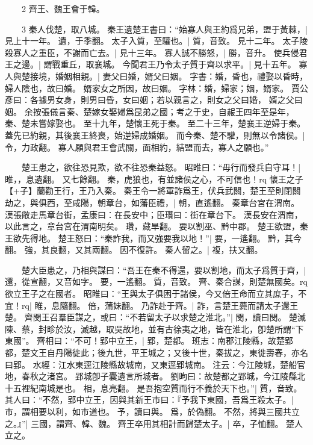 　　2 齊王、魏王會于韓。


　　3 秦人伐楚，取八城。
	秦王遺楚王書曰：“始寡人與王約爲兄弟，盟于黃棘，|{
	見上十一年。
	遺，于季翻。
}
太子入質，至驩也。|{
	質，音致。
	見十二年。
}
太子陵殺寡人之重臣，不謝而亡去。|{
	見十三年。
}
寡人誠不勝怒，|{
	勝，音升。
}
使兵侵君王之邊。|{
	謂戰重丘，取襄城。
}
今聞君王乃令太子質于齊以求平。|{
	見十五年。
}
寡人與楚接境，婚姻相親。|{
	妻父曰婚，婿父曰姻。
	字書：婚，昏也，禮娶以昏時，婦人陰也，故曰婚。
	婿家女之所因，故曰姻。
	字林：婚，婦家；姻，婿家。
	賈公彥曰：各據男女身，則男曰昏，女曰姻；若以親言之，則女之父曰婚， 婿之父曰姻。
	余按張儀言秦、楚嫁女娶婦爲昆弟之國；考之于史，自赧王四年至是年，秦、楚未嘗嫁娶也。
	至十九年，楚懷王死于秦。
	至二十三年，楚襄王逆婦于秦。
	蓋先已約親，其後襄王終喪，始逆婦成婚姻。
}
而今秦、楚不驩，則無以令諸侯。|{
	令，力政翻。
}
寡人願與君王會武關，面相約，結盟而去，寡人之願也。”

　　楚王患之，欲往恐見欺，欲不往恐秦益怒。
	昭睢曰：“毋行而發兵自守耳！|{
	睢，，息遺翻。
	又七餘翻。
}
秦，虎狼也，有並諸侯之心，不可信也！rq
懷王之子【+子】蘭勸王行，王乃入秦。
	秦王令一將軍詐爲王，伏兵武關，楚王至則閉關劫之，與俱西，至咸陽，朝章台，如藩臣禮，|{
	朝，直遙翻。
	秦章台宮在渭南。
	漢張敞走馬章台街，孟康曰：在長安中；臣瓚曰：街在章台下。
	漢長安在渭南，以此言之，章台宮在渭南明矣。
	瓚，藏旱翻。
}
要以割巫、黔中郡。
	楚王欲盟，秦王欲先得地。
	楚王怒曰：“秦詐我，而又強要我以地！”|{
	要，一遙翻。
	黔，其今翻。
	強，其良翻，又其兩翻。
}
因不復許。
	秦人留之。|{
	複，扶又翻。
}

　　楚大臣患之，乃相與謀曰：“吾王在秦不得還，要以割地，而太子爲質于齊，|{
	還，從宣翻，又音如字。
	要，一遙翻。
	質，音致。
}
齊、秦合謀，則楚無國矣。rq
欲立王子之在國者。
	昭睢曰：“王與太子俱困于諸侯，今又倍王命而立其庶子，不宜！rq|{
	睢，息隨翻。
	倍，蒲妹翻。
}
乃詐赴于齊。|{
	詐，言楚王薨而請太子還王楚。
}
齊閔王召羣臣謀之，或曰：“不若留太子以求楚之淮北。”|{
	閔，讀曰閔。
	楚滅陳、蔡，封畛於汝，滅越，取吳故地，並有古徐夷之地，皆在淮北，卽楚所謂“下東國”。
}
齊相曰：“不可！郢中立王，|{
	郢，楚都。
	班志：南郡江陵縣，故楚郢都，楚文王自丹陽徙此；後九世，平王城之；又後十世，秦拔之，東徙壽春，亦名曰郢。
	水經：江水東逕江陵縣故城南，又東逕郢城南。
	注云：今江陵城，楚船官地，春秋之渚宮。
	郢城卽子囊遺言所城者。
	劉昫曰：故楚都之郢城，今江陵縣北十五裡紀南城是也。
	相，息亮翻。
}
是吾抱空質而行不義於天下也。”|{
	質，音致。
}
其人曰：“不然，郢中立王，因與其新王市曰：『予我下東國，吾爲王殺太子。|{
	巿，謂相要以利，如巿道也。
	予，讀曰與。
	爲，於偽翻。
}
不然，將與三國共立之。』”|{
	三國，謂齊、韓、魏。
}
齊王卒用其相計而歸楚太子。|{
	卒，子恤翻。
}
楚人立之。


